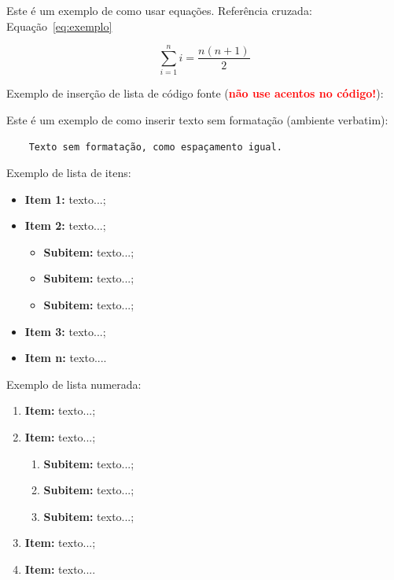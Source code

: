 Este é um exemplo de como usar equações. Referência cruzada: Equação~\ref{eq:exemplo}

\begin{equation}
\sum_{i=1}^{n} i = \frac{n(n+1)}{2}
\label{eq:exemplo}
\end{equation}

\clearpage

Exemplo de inserção de lista de código fonte (\textbf{\textcolor{red}{não use acentos no código!}}):

 



Este é um exemplo de como inserir texto sem formatação (ambiente verbatim):

\begin{verbatim}
	Texto sem formatação, como espaçamento igual.
\end{verbatim}


Exemplo de lista de itens:

\begin{itemize}
	\item \textbf{Item 1:} texto...;
	\item \textbf{Item 2:} texto...;
    \begin{itemize}
            \item \textbf{Subitem:} texto...;
            \item \textbf{Subitem:} texto...;
            \item \textbf{Subitem:} texto...;
        \end{itemize}
	\item \textbf{Item 3:} texto...;
	\item \textbf{Item n:} texto....
\end{itemize}


Exemplo de lista numerada:

\begin{enumerate}
	\item \textbf{Item:} texto...;
	\item \textbf{Item:} texto...;
    \begin{enumerate}
        \item \textbf{Subitem:} texto...;
        \item \textbf{Subitem:} texto...;
        \item \textbf{Subitem:} texto...;
    \end{enumerate}
	\item \textbf{Item:} texto...;
	\item \textbf{Item:} texto....
\end{enumerate}

